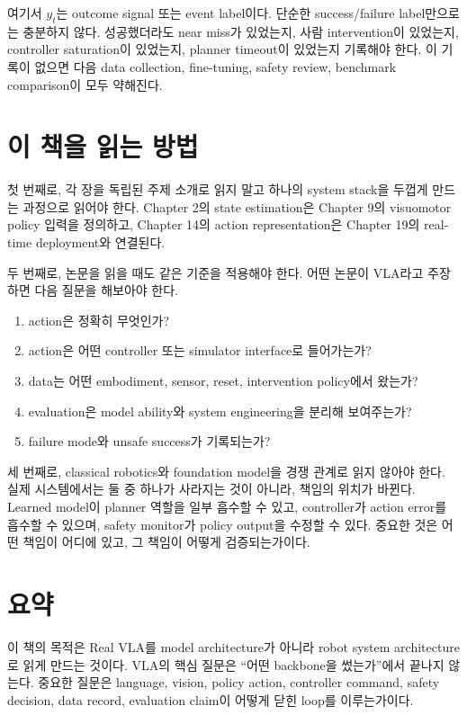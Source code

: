 여기서 $y_t$는 outcome signal 또는 event label이다. 단순한 success/failure label만으로는 충분하지 않다. 성공했더라도 near miss가 있었는지, 사람 intervention이 있었는지, controller saturation이 있었는지, planner timeout이 있었는지 기록해야 한다. 이 기록이 없으면 다음 data collection, fine-tuning, safety review, benchmark comparison이 모두 약해진다.

\section{이 책을 읽는 방법}

첫 번째로, 각 장을 독립된 주제 소개로 읽지 말고 하나의 system stack을 두껍게 만드는 과정으로 읽어야 한다. Chapter 2의 state estimation은 Chapter 9의 visuomotor policy 입력을 정의하고, Chapter 14의 action representation은 Chapter 19의 real-time deployment와 연결된다.

두 번째로, 논문을 읽을 때도 같은 기준을 적용해야 한다. 어떤 논문이 VLA라고 주장하면 다음 질문을 해보아야 한다.

\begin{enumerate}
  \item action은 정확히 무엇인가?
  \item action은 어떤 controller 또는 simulator interface로 들어가는가?
  \item data는 어떤 embodiment, sensor, reset, intervention policy에서 왔는가?
  \item evaluation은 model ability와 system engineering을 분리해 보여주는가?
  \item failure mode와 unsafe success가 기록되는가?
\end{enumerate}

세 번째로, classical robotics와 foundation model을 경쟁 관계로 읽지 않아야 한다. 실제 시스템에서는 둘 중 하나가 사라지는 것이 아니라, 책임의 위치가 바뀐다. Learned model이 planner 역할을 일부 흡수할 수 있고, controller가 action error를 흡수할 수 있으며, safety monitor가 policy output을 수정할 수 있다. 중요한 것은 어떤 책임이 어디에 있고, 그 책임이 어떻게 검증되는가이다.

\section{요약}

이 책의 목적은 Real VLA를 model architecture가 아니라 robot system architecture로 읽게 만드는 것이다. VLA의 핵심 질문은 ``어떤 backbone을 썼는가''에서 끝나지 않는다. 중요한 질문은 language, vision, policy action, controller command, safety decision, data record, evaluation claim이 어떻게 닫힌 loop를 이루는가이다.

